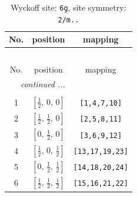 \documentclass[fleqn,8pt]{jsarticle}
\begin{document}
\renewcommand{\arraystretch}{1.2}
\begin{longtable}{ccc}
\caption{Wyckoff site: {\tt 6g}, site symmetry: {\tt 2/m..}}
 \\
 \hline \hline
No. & position & mapping \\ \hline \endfirsthead

\multicolumn{2}{l}{\tablename\ \thetable{}} \\
 \hline \hline
No. & position & mapping \\ \hline \endhead

 \hline \hline
\multicolumn{2}{r}{\footnotesize\it continued ...} \\ \endfoot

 \hline \hline
\multicolumn{2}{r}{} \\ \endlastfoot

1 & $\left[ \frac{1}{2},\, 0,\, 0 \right]$ & {\tt [1,4,7,10]} \\ \hline
2 & $\left[ \frac{1}{2},\, \frac{1}{2},\, 0 \right]$ & {\tt [2,5,8,11]} \\ \hline
3 & $\left[ 0,\, \frac{1}{2},\, 0 \right]$ & {\tt [3,6,9,12]} \\ \hline
4 & $\left[ \frac{1}{2},\, 0,\, \frac{1}{2} \right]$ & {\tt [13,17,19,23]} \\ \hline
5 & $\left[ 0,\, \frac{1}{2},\, \frac{1}{2} \right]$ & {\tt [14,18,20,24]} \\ \hline
6 & $\left[ \frac{1}{2},\, \frac{1}{2},\, \frac{1}{2} \right]$ & {\tt [15,16,21,22]} \\
\end{longtable}
\renewcommand{\arraystretch}{1.2}
\end{document}
